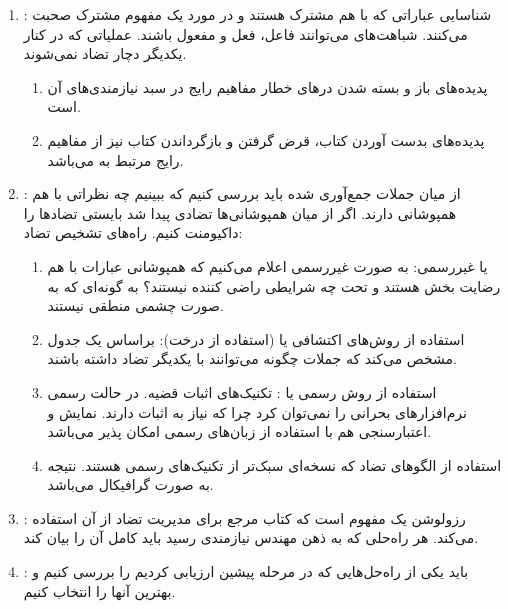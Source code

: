 \begin{enumerate}
    \item {}: شناسایی عباراتی که با هم مشترک
    هستند و در مورد یک مفهوم مشترک صحبت می‌کنند. شباهت‌های می‌توانند فاعل، فعل و
    مفعول باشند. عملیاتی که در کنار یکدیگر دچار تضاد نمی‌شوند. \begin{enumerate}
        \item پدیده‌های باز و بسته شدن در‌های خطار مفاهیم رایج در سبد
        نیازمندی‌های آن است.
        \item پدیده‌های بدست آوردن کتاب، قرض گرفتن و بازگرداندن کتاب نیز از
        مفاهیم رایج مرتبط به  می‌باشد.
    \end{enumerate}
    \item {}: از میان جملات
    جمع‌آوری شده باید بررسی کنیم که ببینیم چه نظراتی با هم همپوشانی دارند. اگر
    از میان همپوشانی‌ها تضادی پیدا شد بایستی تضاد‌ها را داکیومنت کنیم. راه‌های
    تشخیص تضاد: \begin{enumerate}
        \item {} یا غیررسمی: به صورت غیررسمی اعلام می‌کنیم که
        همپوشانی عبارات با هم رضایت بخش هستند و تحت چه شرایطی راضی کننده نیستند؟
        به گونه‌ای که به صورت چشمی منطقی نیستند.
        \item استفاده از روش‌های اکتشافی یا  (استفاده از درخت):
        براساس یک جدول مشخص می‌کند که جملات چگونه می‌توانند با یکدیگر تضاد داشته
        باشند.
        \item استفاده از روش رسمی یا : تکنیک‌های اثبات قضیه. در
        حالت رسمی نرم‌افزار‌های بحرانی را نمی‌توان  کرد چرا که نیاز به
        اثبات دارند. نمایش و اعتبارسنجی هم با استفاده از زبان‌های رسمی امکان
        پذیر می‌باشد.
        \item استفاده از الگو‌های تضاد که نسخه‌ای سبک‌تر از تکنیک‌های رسمی
        هستند. نتیجه به صورت گرافیکال می‌باشد.
    \end{enumerate}
    \item {}: رزولوشن یک مفهوم است که کتاب مرجع
    برای مدیریت تضاد از آن استفاده می‌کند. هر  راه‌حلی که به ذهن مهندس نیازمندی
    رسید باید کامل آن را بیان کند.
    \item {}: باید یکی از راه‌حل‌هایی
    که در مرحله پیشین ارزیابی کردیم را بررسی کنیم و بهترین آنها را انتخاب کنیم.
\end{enumerate}


